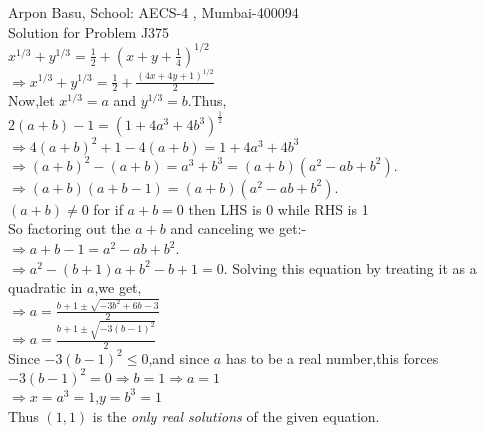 \documentclass[10pt,a4paper]{extarticle}
\begin{document}
 
 Arpon Basu, School: AECS-4 , Mumbai-400094\\
 
 Solution for Problem J375 \\
 
 $x^{1/3}+y^{1/3}=\frac{1}{2}+(x+y+\frac{1}{4})^{1/2}$\\
$\Rightarrow x^{1/3}+y^{1/3}=\frac{1}{2}+\frac{(4x+4y+1)^{1/2}}{2}$\\
Now,let $x^{1/3}=a$ and $y^{1/3}=b$.Thus,\\
$2(a+b)-1=(1+4a^{3}+4b^{3})^{\frac{1}{2}}$\\
$\Rightarrow 4(a+b)^{2}+1-4(a+b)=1+4a^{3}+4b^{3}$\\
$\Rightarrow (a+b)^{2}-(a+b)=a^{3}+b^{3}=(a+b)(a^{2}-ab+b^{2})$.\\
$\Rightarrow (a+b)(a+b-1)=(a+b)(a^{2}-ab+b^{2})$.\\
$(a+b)\neq 0$ for if $a+b=0$ then LHS is 0 while RHS is 1 \\
So factoring out the $a+b$ and canceling  we get:-\\
$\Rightarrow a+b-1=a^{2}-ab+b^{2} $.\\
$\Rightarrow a^{2}-(b+1)a+b^{2}-b+1=0$. Solving this equation by treating it as a quadratic in $a$,we get,\\
$\Rightarrow a=\frac{b+1\pm \sqrt{-3b^{2}+6b-3}}{2}$\\
$\Rightarrow a=\frac{b+1\pm \sqrt{-3(b-1)^{2}}}{2}$\\
Since $-3(b-1)^{2}\leq 0$,and since $a$ has to be a real number,this forces \\
$-3(b-1)^{2}=0\Rightarrow b=1\Rightarrow a=1$ \\
$ \Rightarrow x=a^{3}=1$,$y=b^{3}=1 $\\
Thus $(1,1)$ is the \textit{only real solutions} of the given equation.\\
 
 
\end{document}
